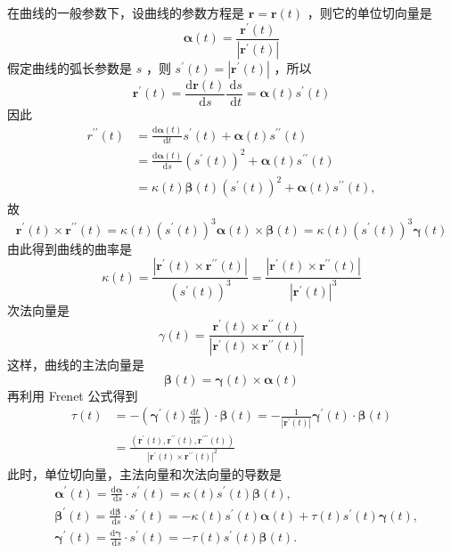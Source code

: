 在曲线的一般参数下，设曲线的参数方程是 $\boldsymbol{r}=\boldsymbol{r}(t)$ ，则它的单位切向量是
\[
\boldsymbol{\alpha}(t)=\frac{\boldsymbol{r}^{\prime}(t)}{\left|\boldsymbol{r}^{\prime}(t)\right|}
\]
假定曲线的弧长参数是 $s$ ，则 $s^{\prime}(t)=\left|\boldsymbol{r}^{\prime}(t)\right|$ ，所以
\[
\boldsymbol{r}^{\prime}(t)=\frac{\mathrm{d} \boldsymbol{r}(t)}{\mathrm{d} s} \frac{\mathrm{~d} s}{\mathrm{~d} t}=\boldsymbol{\alpha}(t) s^{\prime}(t)
\]
因此
\[
\begin{aligned}
r^{\prime \prime}(t) & =\frac{\mathrm{d} \boldsymbol{\alpha}(t)}{\mathrm{d} t} s^{\prime}(t)+\boldsymbol{\alpha}(t) s^{\prime \prime}(t) \\
& =\frac{\mathrm{d} \boldsymbol{\alpha}(t)}{\mathrm{d} s}\left(s^{\prime}(t)\right)^2+\boldsymbol{\alpha}(t) s^{\prime \prime}(t) \\
& =\kappa(t) \boldsymbol{\beta}(t)\left(s^{\prime}(t)\right)^2+\boldsymbol{\alpha}(t) s^{\prime \prime}(t),
\end{aligned}
\]
故
\[
\boldsymbol{r}^{\prime}(t) \times \boldsymbol{r}^{\prime \prime}(t)=\kappa(t)\left(s^{\prime}(t)\right)^3 \boldsymbol{\alpha}(t) \times \boldsymbol{\beta}(t)=\kappa(t)\left(s^{\prime}(t)\right)^3 \boldsymbol{\gamma}(t)
\]
由此得到曲线的曲率是
\[
\kappa(t)=\frac{\left|\boldsymbol{r}^{\prime}(t) \times \boldsymbol{r}^{\prime \prime}(t)\right|}{\left(s^{\prime}(t)\right)^3}=\frac{\left|\boldsymbol{r}^{\prime}(t) \times \boldsymbol{r}^{\prime \prime}(t)\right|}{\left|\boldsymbol{r}^{\prime}(t)\right|^3}
\]
次法向量是
\[
\gamma(t)=\frac{\boldsymbol{r}^{\prime}(t) \times \boldsymbol{r}^{\prime \prime}(t)}{\left|\boldsymbol{r}^{\prime}(t) \times \boldsymbol{r}^{\prime \prime}(t)\right|}
\]
这样，曲线的主法向量是
\[
\boldsymbol{\beta}(t)=\boldsymbol{\gamma}(t) \times \boldsymbol{\alpha}(t)
\]
再利用 Frenet 公式得到
\[
\begin{aligned}
\tau(t) & =-\left(\boldsymbol{\gamma}^{\prime}(t) \frac{\mathrm{d} t}{\mathrm{~d} s}\right) \cdot \boldsymbol{\beta}(t)=-\frac{1}{\left|\boldsymbol{r}^{\prime}(t)\right|} \boldsymbol{\gamma}^{\prime}(t) \cdot \boldsymbol{\beta}(t) \\
& =\frac{\left(\boldsymbol{r}^{\prime}(t), \boldsymbol{r}^{\prime \prime}(t), \boldsymbol{r}^{\prime \prime \prime}(t)\right)}{\left|\boldsymbol{r}^{\prime}(t) \times \boldsymbol{r}^{\prime \prime}(t)\right|^2}
\end{aligned}
\]
此时，单位切向量，主法向量和次法向量的导数是
\[
\begin{aligned}
& \boldsymbol{\alpha}^{\prime}(t)=\frac{\mathrm{d} \boldsymbol{\alpha}}{\mathrm{~d} s} \cdot s^{\prime}(t)=\kappa(t) s^{\prime}(t) \boldsymbol{\beta}(t), \\
& \boldsymbol{\beta}^{\prime}(t)=\frac{\mathrm{d} \boldsymbol{\beta}}{\mathrm{~d} s} \cdot s^{\prime}(t)=-\kappa(t) s^{\prime}(t) \boldsymbol{\alpha}(t)+\tau(t) s^{\prime}(t) \boldsymbol{\gamma}(t), \\
& \boldsymbol{\gamma}^{\prime}(t)=\frac{\mathrm{d} \boldsymbol{\gamma}}{\mathrm{~d} s} \cdot s^{\prime}(t)=-\tau(t) s^{\prime}(t) \boldsymbol{\beta}(t) .
\end{aligned}
\]
